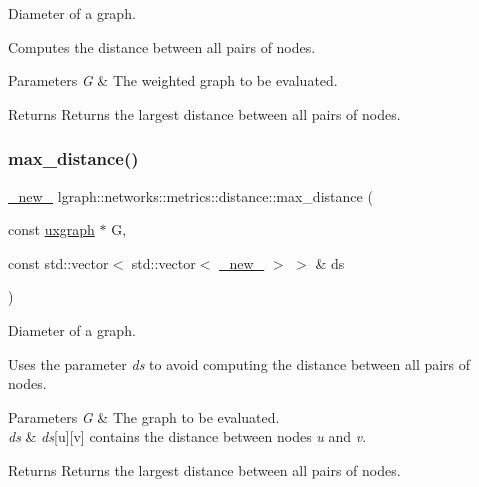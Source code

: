 Diameter of a graph. 

Computes the distance between all pairs of nodes.


\begin{DoxyParams}{Parameters}
{\em G} & The weighted graph to be evaluated. \\
\hline
\end{DoxyParams}
\begin{DoxyReturn}{Returns}
Returns the largest distance between all pairs of nodes. 
\end{DoxyReturn}
\mbox{\label{namespacelgraph_1_1networks_1_1metrics_1_1distance_a26f8b017d849c3b2157aad7bc8e2aa84}} 
\subsubsection{\texorpdfstring{max\+\_\+distance()}{max\_distance()}\hspace{0.1cm}{\footnotesize\ttfamily [3/4]}}
{\footnotesize\ttfamily \hyperlink{namespacelgraph_aa930092705699c3af78e3a4de7880a3f}{\+\_\+new\+\_\+} lgraph\+::networks\+::metrics\+::distance\+::max\+\_\+distance (\begin{DoxyParamCaption}\item[{const \hyperlink{classlgraph_1_1uxgraph}{uxgraph} $\ast$}]{G,  }\item[{const std\+::vector$<$ std\+::vector$<$ \hyperlink{namespacelgraph_aa930092705699c3af78e3a4de7880a3f}{\+\_\+new\+\_\+} $>$ $>$ \&}]{ds }\end{DoxyParamCaption})}



Diameter of a graph. 

Uses the parameter {\itshape ds} to avoid computing the distance between all pairs of nodes.


\begin{DoxyParams}{Parameters}
{\em G} & The graph to be evaluated. \\
\hline
{\em ds} & {\itshape ds}\mbox{[}u\mbox{]}\mbox{[}v\mbox{]} contains the distance between nodes {\itshape u} and {\itshape v}. \\
\hline
\end{DoxyParams}
\begin{DoxyReturn}{Returns}
Returns the largest distance between all pairs of nodes. 
\end{DoxyReturn}
\mbox{\label{namespacelgraph_1_1networks_1_1metrics_1_1distance_ab8e7a10f4ecd1e1babf463b151027fa5}} 
